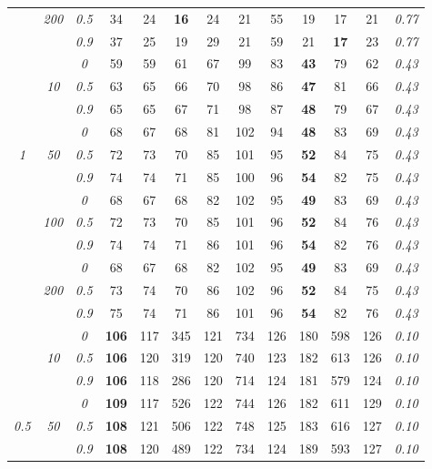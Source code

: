 \begin{table}
\begin{center}
\begin{tabular}{ccc|cc|cc|cc|cc|c|c}
 & \it  200  & \it  0.5  & 34 & 24 & {\bf 16} & 24 & 21 & 55 & 19 & 17 & 21 & \it  0.77 \\
& & \it  0.9  & 37 & 25 & 19 & 29 & 21 & 59 & 21 & {\bf 17} & 23 & \it  0.77 \\
\hline\rule{0pt}{3ex}
& & \it  0  & 59 & 59 & 61 & 67 & 99 & 83 & {\bf 43} & 79 & 62 & \it  0.43 \\
 & \it  10  & \it  0.5  & 63 & 65 & 66 & 70 & 98 & 86 & {\bf 47} & 81 & 66 & \it  0.43 \\
& & \it  0.9  & 65 & 65 & 67 & 71 & 98 & 87 & {\bf 48} & 79 & 67 & \it  0.43 \\[1ex]
\cline{2-3}\rule{0pt}{3ex}
& & \it  0  & 68 & 67 & 68 & 81 & 102 & 94 & {\bf 48} & 83 & 69 & \it  0.43 \\
\it  1  & \it  50  & \it  0.5  & 72 & 73 & 70 & 85 & 101 & 95 & {\bf 52} & 84 & 75 & \it  0.43 \\
& & \it  0.9  & 74 & 74 & 71 & 85 & 100 & 96 & {\bf 54} & 82 & 75 & \it  0.43 \\[1ex]
\cline{2-3}\rule{0pt}{3ex}
& & \it  0  & 68 & 67 & 68 & 82 & 102 & 95 & {\bf 49} & 83 & 69 & \it  0.43 \\
 & \it  100  & \it  0.5  & 72 & 73 & 70 & 85 & 101 & 96 & {\bf 52} & 84 & 76 & \it  0.43 \\
& & \it  0.9  & 74 & 74 & 71 & 86 & 101 & 96 & {\bf 54} & 82 & 76 & \it  0.43 \\[1ex]
\cline{2-3}\rule{0pt}{3ex}
& & \it  0  & 68 & 67 & 68 & 82 & 102 & 95 & {\bf 49} & 83 & 69 & \it  0.43 \\
 & \it  200  & \it  0.5  & 73 & 74 & 70 & 86 & 102 & 96 & {\bf 52} & 84 & 75 & \it  0.43 \\
& & \it  0.9  & 75 & 74 & 71 & 86 & 101 & 96 & {\bf 54} & 82 & 76 & \it  0.43 \\
\hline\rule{0pt}{3ex}
& & \it  0  & {\bf 106} & 117 & 345 & 121 & 734 & 126 & 180 & 598 & 126 & \it  0.10 \\
 & \it  10  & \it  0.5  & {\bf 106} & 120 & 319 & 120 & 740 & 123 & 182 & 613 & 126 & \it  0.10 \\
& & \it  0.9  & {\bf 106} & 118 & 286 & 120 & 714 & 124 & 181 & 579 & 124 & \it  0.10 \\[1ex]
\cline{2-3}\rule{0pt}{3ex}
& & \it  0  & {\bf 109} & 117 & 526 & 122 & 744 & 126 & 182 & 611 & 129 & \it  0.10 \\
\it  0.5  & \it  50  & \it  0.5  & {\bf 108} & 121 & 506 & 122 & 748 & 125 & 183 & 616 & 127 & \it  0.10 \\
& & \it  0.9  & {\bf 108} & 120 & 489 & 122 & 734 & 124 & 189 & 593 & 127 & \it  0.10 \\[1ex]

\end{tabular}
\end{center}
\end{table}
